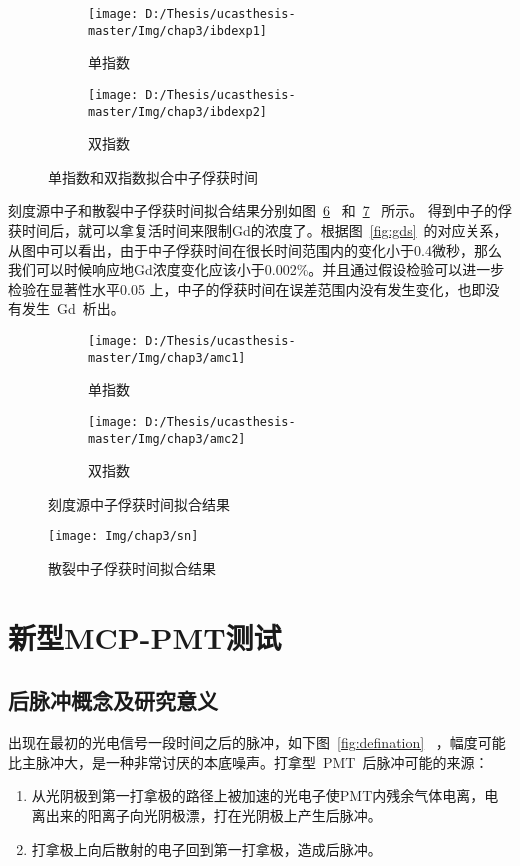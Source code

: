 \begin{figure}[!htbp]
  \centering
  \begin{subfigure}[b]{\MySubFactor\textwidth}
    \texttt{[image: D:/Thesis/ucasthesis-master/Img/chap3/ibdexp1]}
    \caption{单指数}
    \label{fig:ibdexp_1}
  \end{subfigure}%
  \quad\quad\quad\quad%
  \begin{subfigure}[b]{\MySubFactor\textwidth}
    \texttt{[image: D:/Thesis/ucasthesis-master/Img/chap3/ibdexp2]}
    \caption{ 双指数}
    \label{fig:ibdexp_2}
  \end{subfigure}
  \caption{ 单指数和双指数拟合中子俘获时间}
  \label{fig:ibdexp}
\end{figure}
刻度源中子和散裂中子俘获时间拟合结果分别如图~\ref{fig:amc}~ 和~\ref{fig:sn}~ 所示。
得到中子的俘获时间后，就可以拿复活时间来限制Gd的浓度了。根据图~\ref{fig:gds}~的对应关系，从图中可以看出，由于中子俘获时间在很长时间范围内的变化小于0.4微秒，那么我们可以时候响应地Gd浓度变化应该小于0.002\%。并且通过假设检验可以进一步检验在显著性水平0.05 上，中子的俘获时间在误差范围内没有发生变化，也即没有发生~Gd~析出。
\begin{figure}[!htbp]
  \centering
  \begin{subfigure}[b]{\MySubFactor\textwidth}
    \texttt{[image: D:/Thesis/ucasthesis-master/Img/chap3/amc1]}
    \caption{单指数}
    \label{fig:amc_1}
  \end{subfigure}%
  \quad\quad\quad\quad%
  \begin{subfigure}[b]{\MySubFactor\textwidth}
    \texttt{[image: D:/Thesis/ucasthesis-master/Img/chap3/amc2]}
    \caption{ 双指数}
    \label{fig:amc_2}
  \end{subfigure}
  \caption{ 刻度源中子俘获时间拟合结果}
  \label{fig:amc}
\end{figure}


 \begin{figure}[!htbp]
  \centering
   \texttt{[image: Img/chap3/sn]}
    \caption{散裂中子俘获时间拟合结果}
  \label{fig:sn}
\end{figure}

\section{新型MCP-PMT测试}
\subsection{后脉冲概念及研究意义}
出现在最初的光电信号一段时间之后的脉冲，如下图~\ref{fig:defination}~ ，幅度可能比主脉冲大，是一种非常讨厌的本底噪声。打拿型~PMT~后脉冲可能的来源：
\begin{enumerate}
\item 从光阴极到第一打拿极的路径上被加速的光电子使PMT内残余气体电离，电离出来的阳离子向光阴极漂，打在光阴极上产生后脉冲。
\item 打拿极上向后散射的电子回到第一打拿极，造成后脉冲。
 \end{enumerate} 
 
